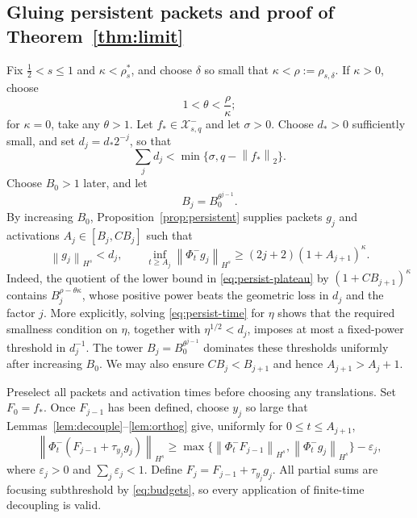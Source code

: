 \documentclass[11pt,reqno]{amsart}
\numberwithin{equation}{section}
\theoremstyle{remark}
\newcommand{\X}{\mathcal X}
\newcommand{\eps}{\varepsilon}
\newcommand{\half}{\frac12}
\newcommand{\norm}[1]{\left\lVert #1\right\rVert}
\newcommand{\flow}[1]{\Phi^{#1}}
\newcommand{\trans}[1]{\tau_{#1}}
\begin{document}
\subsection{Gluing persistent packets and proof of Theorem~\ref{thm:limit}}

Fix $\half<s\leq1$ and $\kappa<\rho_s^*$, and choose $\delta$ so small that
$\kappa<\rho:=\rho_{s,\delta}$.  If $\kappa>0$, choose
\begin{equation}\label{eq:theta}
 1<\theta<\frac\rho\kappa;
\end{equation}
for $\kappa=0$, take any $\theta>1$.  Let $f_*\in\X^-_{s,q}$ and let
$\sigma>0$.  Choose $d_*>0$ sufficiently small, and set $d_j=d_*2^{-j}$, so
that
\begin{equation}\label{eq:budgets}
 \sum_jd_j<\min\{\sigma,q-\norm{f_*}_2\}.
\end{equation}
Choose $B_0>1$ later, and let
\begin{equation}\label{eq:targets}
 B_j=B_0^{\theta^{j-1}}.
\end{equation}
By increasing $B_0$, Proposition~\ref{prop:persistent} supplies packets
$g_j$ and activations $A_j\in[B_j,CB_j]$ such that
\begin{equation}\label{eq:scheduled}
 \norm{g_j}_{H^s}<d_j,
 \qquad
 \inf_{t\geq A_j}\norm{\flow-_tg_j}_{H^s}
 \geq(2j+2)(1+A_{j+1})^\kappa.
\end{equation}
Indeed, the quotient of the lower bound in
\eqref{eq:persist-plateau} by $(1+CB_{j+1})^\kappa$ contains
$B_j^{\rho-\theta\kappa}$, whose positive power beats the geometric loss in
$d_j$ and the factor $j$.  More explicitly, solving
\eqref{eq:persist-time} for $\eta$ shows that the required smallness
condition on $\eta$, together with $\eta^{1/2}<d_j$, imposes at most a
fixed-power threshold in $d_j^{-1}$.  The tower
$B_j=B_0^{\theta^{j-1}}$ dominates these thresholds uniformly after increasing
$B_0$.  We may also ensure
$CB_j<B_{j+1}$ and hence $A_{j+1}>A_j+1$.

Preselect all packets and activation times before choosing any translations.
Set $F_0=f_*$.  Once $F_{j-1}$ has been defined, choose $y_j$ so large that
Lemmas~\ref{lem:decouple}--\ref{lem:orthog} give, uniformly for
$0\leq t\leq A_{j+1}$,
\begin{equation}\label{eq:stage-lower}
 \norm{\flow-_t(F_{j-1}+\trans{y_j}g_j)}_{H^s}
 \geq
 \max\{\norm{\flow-_tF_{j-1}}_{H^s},
 \norm{\flow-_tg_j}_{H^s}\}-\eps_j,
\end{equation}
where $\eps_j>0$ and $\sum_j\eps_j<1$.  Define
$F_j=F_{j-1}+\trans{y_j}g_j$.  All partial sums are focusing subthreshold by
\eqref{eq:budgets}, so every application of finite-time decoupling is valid.
\end{document}
